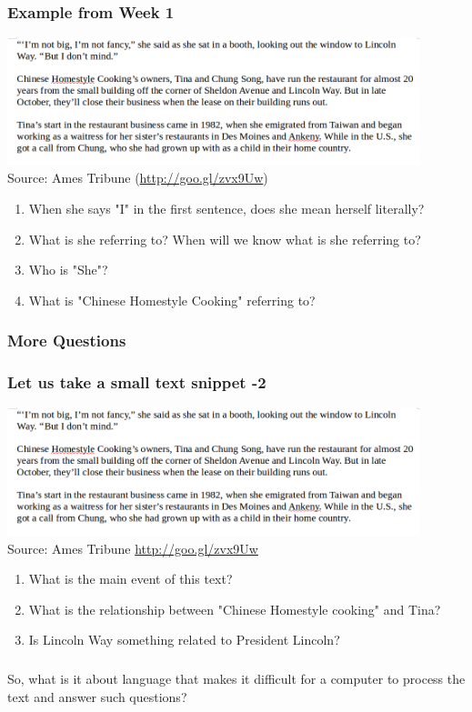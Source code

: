 \documentclass{beamer}
\begin{document}
\begin{frame}
\frametitle{Example from Week 1}
\includegraphics[width=0.9\textwidth]{Example.png}
\\ \footnotesize{Source: Ames Tribune (\url{http://goo.gl/zvx9Uw})}

\begin{enumerate}
\item When she says "I" in the first sentence, does she mean herself literally? 
\item What is she referring to? When will we know what is she referring to?
\item Who is "She"?
\item What is "Chinese Homestyle Cooking" referring to?
\end{enumerate}
\end{frame}

\begin{frame}
\frametitle{More Questions}
\frametitle{Let us take a small text snippet -2}
\includegraphics[width=0.9\textwidth]{Example.png}
\\ \footnotesize{Source: Ames Tribune \url{http://goo.gl/zvx9Uw}}
\begin{enumerate}
\item What is the main event of this text?
\item What is the relationship between "Chinese Homestyle cooking" and Tina?
\item Is Lincoln Way something related to President Lincoln?
\end{enumerate}
\end{frame}


\begin{frame}
\frametitle{}
\Large So, what is it about language that makes it difficult for a computer to process the text and answer such questions?
\end{frame}
\end{document}
